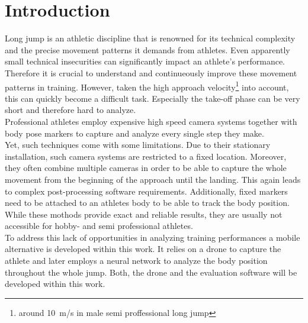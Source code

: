 \chapter{Introduction}
Long jump is an athletic discipline that is renowned for its technical 
complexity and the precise movement patterns it demands from athletes.
Even apparently small technical insecurities can significantly impact an 
athlete's performance.
Therefore it is crucial to understand and continueously improve these movement 
patterns in training.
However, taken the high approach velocity\footnote{around 10~m/s in male semi 
proffessional long jump} into account, this can quickly become a difficult 
task.
Especially the take-off phase can be very short and therefore hard to analyze.\\

\noindent Professional athletes employ expensive high speed camera systems 
together with body pose markers to capture and analyze every single step 
they make.\\
Yet, such techniques come with some limitations.
Due to their stationary installation, such camera systems are restricted to a
fixed location.
Moreover, they often combine multiple cameras in order to be able to capture 
the whole movement from the beginning of the approach until the 
landing.
This again leads to complex post-processing software requirements.
Additionally, fixed markers need to be attached to an athletes body to be able 
to track the body position.\\

\noindent While these mothods provide exact and reliable results, they are 
usually not accessible for hobby- and semi professional athletes.\\
To address this lack of opportunities in analyzing training performances a 
mobile alternative is developed within this work.
It relies on a drone to capture the athlete and later employs a neural network
to analyze the body position throughout the whole jump.
Both, the drone and the evaluation software will be developed within this work.
